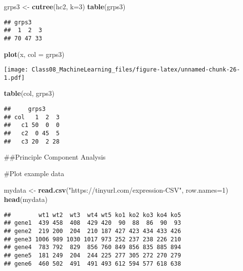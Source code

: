 \documentclass[]{article}
\newenvironment{Shaded}{\begin{snugshade}}{\end{snugshade}}
\newcommand{\DataTypeTok}[1]{\textcolor[rgb]{0.13,0.29,0.53}{#1}}
\newcommand{\DecValTok}[1]{\textcolor[rgb]{0.00,0.00,0.81}{#1}}
\newcommand{\KeywordTok}[1]{\textcolor[rgb]{0.13,0.29,0.53}{\textbf{#1}}}
\newcommand{\NormalTok}[1]{#1}
\newcommand{\StringTok}[1]{\textcolor[rgb]{0.31,0.60,0.02}{#1}}
\begin{document}
\begin{Shaded}
\begin{Highlighting}[]
\NormalTok{grps3 <-}\StringTok{ }\KeywordTok{cutree}\NormalTok{(hc2, }\DataTypeTok{k=}\DecValTok{3}\NormalTok{)}
\KeywordTok{table}\NormalTok{(grps3)}
\end{Highlighting}
\end{Shaded}

\begin{verbatim}
## grps3
##  1  2  3 
## 70 47 33
\end{verbatim}

\begin{Shaded}
\begin{Highlighting}[]
\KeywordTok{plot}\NormalTok{(x, }\DataTypeTok{col =}\NormalTok{ grps3)}
\end{Highlighting}
\end{Shaded}

\texttt{[image: Class08\_MachineLearning\_files/figure-latex/unnamed-chunk-26-1.pdf]}

\begin{Shaded}
\begin{Highlighting}[]
\KeywordTok{table}\NormalTok{(col, grps3)}
\end{Highlighting}
\end{Shaded}

\begin{verbatim}
##     grps3
## col   1  2  3
##   c1 50  0  0
##   c2  0 45  5
##   c3 20  2 28
\end{verbatim}

\#\#Principle Component Analysis

\#Plot example data

\begin{Shaded}
\begin{Highlighting}[]
\NormalTok{mydata <-}\StringTok{ }\KeywordTok{read.csv}\NormalTok{(}\StringTok{"https://tinyurl.com/expression-CSV"}\NormalTok{,}
 \DataTypeTok{row.names=}\DecValTok{1}\NormalTok{)}
\KeywordTok{head}\NormalTok{(mydata)}
\end{Highlighting}
\end{Shaded}

\begin{verbatim}
##        wt1 wt2  wt3  wt4 wt5 ko1 ko2 ko3 ko4 ko5
## gene1  439 458  408  429 420  90  88  86  90  93
## gene2  219 200  204  210 187 427 423 434 433 426
## gene3 1006 989 1030 1017 973 252 237 238 226 210
## gene4  783 792  829  856 760 849 856 835 885 894
## gene5  181 249  204  244 225 277 305 272 270 279
## gene6  460 502  491  491 493 612 594 577 618 638
\end{verbatim}
\end{document}
